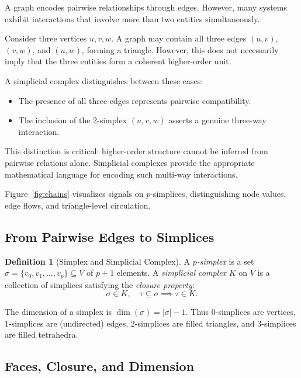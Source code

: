 \documentclass[11pt]{article}
\theoremstyle{definition}
\newtheorem{definition}[theorem]{Definition}
\theoremstyle{remark}
\begin{document}
A graph encodes pairwise relationships through edges. However, many systems exhibit interactions that involve more than two entities simultaneously.

Consider three vertices $u, v, w$. A graph may contain all three edges $(u,v)$, $(v,w)$, and $(u,w)$, forming a triangle. However, this does not necessarily imply that the three entities form a coherent higher-order unit.

A simplicial complex distinguishes between these cases:
\begin{itemize}
    \item The presence of all three edges represents pairwise compatibility.
    \item The inclusion of the 2-simplex $(u,v,w)$ asserts a genuine three-way interaction.
\end{itemize}

This distinction is critical: higher-order structure cannot be inferred from pairwise relations alone. Simplicial complexes provide the appropriate mathematical language for encoding such multi-way interactions.

Figure~\ref{fig:chains} visualizes signals on $p$-simplices, distinguishing
node values, edge flows, and triangle-level circulation.

\FigureATwo

\subsection{From Pairwise Edges to Simplices}

\begin{definition}[Simplex and Simplicial Complex]
A \emph{$p$-simplex} is a set $\sigma = \{v_0,v_1,\dots,v_p\} \subseteq V$ of
$p+1$ elements. A \emph{simplicial complex} $K$ on $V$ is a collection of
simplices satisfying the \emph{closure property}:
\[
  \sigma \in K,\quad \tau \subseteq \sigma \implies \tau \in K.
\]
\end{definition}

The dimension of a simplex is $\dim(\sigma) = |\sigma|-1$. Thus 0-simplices
are vertices, 1-simplices are (undirected) edges, 2-simplices are filled
triangles, and 3-simplices are filled tetrahedra.

\subsection{Faces, Closure, and Dimension}
\end{document}
